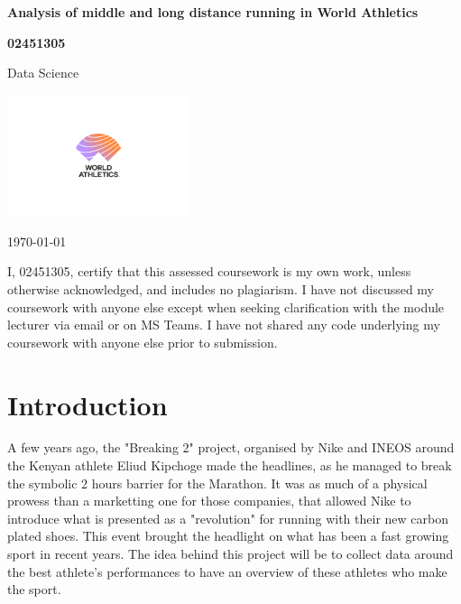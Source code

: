 \documentclass[10pt, a4paper]{article}
\newcommand\course{Data Science}                            %
\begin{document}
\begin{titlepage}
    \begin{center}
        \vspace*{3cm}
            
        \Huge
        \textbf{Analysis of middle and long distance running in World Athletics}
            
        \vspace{1cm}
        \huge
            
        \vspace{1.5cm}
        \Large
            
        \textbf{02451305}                      %
        
            
        \vfill
        
        \course
            
        \vspace{1cm}
            
        \includegraphics[width=0.4\textwidth]{Data/Figure_for_report/Word_athletic_logo.png}
        \\
        
        \Large
        
        \today
            
    \end{center}
\end{titlepage}


\newpage

I, 02451305, certify that this assessed coursework is my own work, unless otherwise acknowledged, and includes no
plagiarism. I have not discussed my coursework with anyone else except when seeking clarification with the module
lecturer via email or on MS Teams. I have not shared any code underlying my coursework with anyone else prior to
submission.

\newpage

\section*{Introduction}

A few years ago, the "Breaking 2" project, organised by Nike and INEOS around the Kenyan athlete Eliud Kipchoge made the headlines, as he managed to break the symbolic 2 hours barrier for the Marathon. It was as much of a physical prowess than a marketting one for those companies, that allowed Nike to introduce what is presented as a "revolution" for running with their new carbon plated shoes. 
This event brought the headlight on what has been a fast growing sport in recent years. The idea behind this project will be to collect data around the best athlete's performances to have an overview of these athletes who make the sport.
\end{document}
